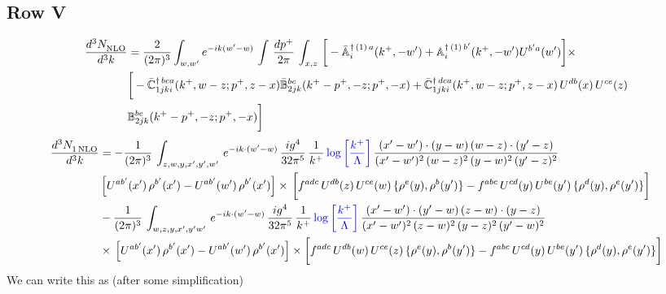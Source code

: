 \documentclass[9pt]{article}
\def\mf#1{\mathbb{#1}}
\numberwithin{equation}{section}
\begin{document}
\subsection{Row V}
\begin{align}
    \frac{d^{3}N_{\rm NLO}^{\rm}}{d^{3}k}  & = \frac{2}{(2\pi)^{3}}  \int_{w, w^\prime} e^{-ik(w^\prime-w)}\, \int\, \frac{dp^{+}}{2\pi}\,\int_{x,z}\, \bigg[-\bar{\mf{A}}^{\dagger\,(1)\,a}_{i}(k^{+},-w^{\prime})+\mf{A}^{\dagger\, (1)\, b^{\prime}}_{i}(k^{+},-w^{\prime})U^{b^{\prime}a}(w^{\prime})\bigg]\times\notag \\ & \bigg[-\Bar{\mf{C}}^{\dagger\, bca}_{1jki}(k^{+},w-z;p^{+},z-x)\Bar{\mf{B}}^{bc}_{2jk}(k^{+}-p^{+},- z;p^{+},-x)+\bar{\mf{C}}^{\dagger\, dca}_{1jki}(k^+,w-z; p^+, z-x)\,U^{db}(x)\,U^{ce}(z) \notag \\ & {\mf{B}}^{be}_{2jk} (k^{+}-p^+, -z; p^+, -x) \bigg]\nonumber
\end{align}
\begin{align}
     \frac{d^{3}N_{1\,\rm NLO}^{\rm}}{d^{3}k}  & =  -\frac{1}{(2\pi)^{3}}\, \int_{z,w,y,x',y',w'}\,e^{-ik\cdot (w^\prime-w)}\,\frac{ig^{4}}{32\pi^{5}}\, \frac{1}{k^{+}}\,{\color{blue}\log{\left[\frac{k^{+}}{\Lambda}\right]}}\,\frac{(x'-w')\cdot (y-w)\,(w-z)\cdot (y'-z)}{(x'-w')^{2}\,(w-z)^{2}\,(y-w)^{2}\,(y'-z)^{2}}\,\notag \\ & \left[U^{ab'}(x')\,\rho^{b'}(x')-U^{ab'}(w')\,\rho^{b'}(x')\right]\times\, \bigg[f^{adc}\,U^{db}(z)\,U^{ce}(w)\, \{\rho^{e}(y),\rho^{b}(y')\}-f^{abc}\,U^{cd}(y)\,U^{be}(y')\, \{\rho^{d}(y),\rho^{e}(y')\}\bigg]\notag \\ &  -\frac{1}{(2\pi)^{3}}\, \int_{w,z,y,x',y'w'}\,e^{-ik\cdot (w^\prime-w)}\,\frac{ig^{4}}{32\pi^{5}}\, \frac{1}{k^{+}}\,{\color{blue}\log{\left[\frac{k^{+}}{\Lambda}\right]}}\,\frac{(x'-w')\cdot (y'-w)\,(z-w)\cdot (y-z)}{(x'-w')^{2}\,(z-w)^{2}\,(y-z)^{2}\,(y'-w)^{2}}\notag \\ & \times\, \left[U^{ab'}(x')\,\rho^{b'}(x')-U^{ab'}(w')\,\rho^{b'}(x')\right]\times \bigg[f^{adc}\,U^{db}(w)\,U^{ce}(z)\, \{\rho^{e}(y),\rho^{b}(y')\}-f^{abc}\,U^{cd}(y)\,U^{be}(y')\, \{\rho^{d}(y),\rho^{e}(y')\}\bigg]
\end{align}
We can write this as (after some simplification)
\end{document}
